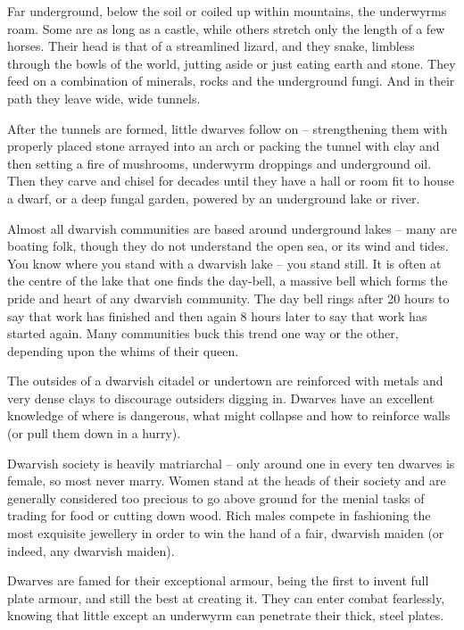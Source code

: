 \documentclass[titlepage,a4paper,openany]{book}
\begin{document}
\begin{multicols}{2}

Far underground, below the soil or coiled up within mountains, the underwyrms roam. Some are as long as a castle, while others stretch only the length of a few horses. Their head is that of a streamlined lizard, and they snake, limbless through the bowls of the world, jutting aside or just eating earth and stone. They feed on a combination of minerals, rocks and the underground fungi. And in their path they leave wide, wide tunnels.

After the tunnels are formed, little dwarves follow on -- strengthening them with properly placed stone arrayed into an arch or packing the tunnel with clay and then setting a fire of mushrooms, underwyrm droppings and underground oil. Then they carve and chisel for decades until they have a hall or room fit to house a dwarf, or a deep fungal garden, powered by an underground lake or river.

Almost all dwarvish communities are based around underground lakes -- many are boating folk, though they do not understand the open sea, or its wind and tides. You know where you stand with a dwarvish lake -- you stand still. It is often at the centre of the lake that one finds the day-bell, a massive bell which forms the pride and heart of any dwarvish community. The day bell rings after 20 hours to say that work has finished and then again 8 hours later to say that work has started again. Many communities buck this trend one way or the other, depending upon the whims of their queen.

The outsides of a dwarvish citadel or undertown are reinforced with metals and very dense clays to discourage outsiders digging in. Dwarves have an excellent knowledge of where is dangerous, what might collapse and how to reinforce walls (or pull them down in a hurry).

Dwarvish society is heavily matriarchal -- only around one in every ten dwarves is female, so most never marry. Women stand at the heads of their society and are generally considered too precious to go above ground for the menial tasks of trading for food or cutting down wood. Rich males compete in fashioning the most exquisite jewellery in order to win the hand of a fair, dwarvish maiden (or indeed, any dwarvish maiden).

Dwarves are famed for their exceptional armour, being the first to invent full plate armour, and still the best at creating it. They can enter combat fearlessly, knowing that little except an underwyrm can penetrate their thick, steel plates.


\end{multicols}
\end{document}
